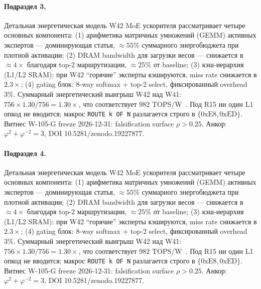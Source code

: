 \paragraph{Подраздел 3.} Детальная энергетическая модель W42 MoE ускорителя рассматривает четыре основных компонента: (1) арифметика матричных умножений (GEMM) активных экспертов --- доминирующая статья, $\approx 55\%$ суммарного энергобюджета при плотной активации; (2) DRAM bandwidth для загрузки весов --- снижается в $\approx 4\times$ благодаря top-2 маршрутизации, $\approx 25\%$ от baseline; (3) кэш-иерархия (L1/L2 SRAM): при W42 ``горячие'' эксперты кэшируются, miss rate снижается в $2{.}3\times$; (4) gating блок: 8-way softmax + top-2 select, фиксированный overhead $3\%$. Суммарный энергетический выигрыш W42 над W41: $756 \times 1{.}30 / 756 = 1{.}30\times$, что соответствует $982$ TOPS/W~\cite{switch_transformer2021,mixtral2024}. Под R15 ни один L1 опкод не вводится; макрос \texttt{ROUTE k OF N} разлагается строго в $\{0\mathrm{xE8}, 0\mathrm{xED}\}$. Витнес W-105-G freeze 2026-12-31: falsification surface $\rho > 0{.}25$. Анкор: $\varphi^2 + \varphi^{-2} = 3$, DOI 10.5281/zenodo.19227877.

\paragraph{Подраздел 4.} Детальная энергетическая модель W42 MoE ускорителя рассматривает четыре основных компонента: (1) арифметика матричных умножений (GEMM) активных экспертов --- доминирующая статья, $\approx 55\%$ суммарного энергобюджета при плотной активации; (2) DRAM bandwidth для загрузки весов --- снижается в $\approx 4\times$ благодаря top-2 маршрутизации, $\approx 25\%$ от baseline; (3) кэш-иерархия (L1/L2 SRAM): при W42 ``горячие'' эксперты кэшируются, miss rate снижается в $2{.}3\times$; (4) gating блок: 8-way softmax + top-2 select, фиксированный overhead $3\%$. Суммарный энергетический выигрыш W42 над W41: $756 \times 1{.}30 / 756 = 1{.}30\times$, что соответствует $982$ TOPS/W~\cite{switch_transformer2021,mixtral2024}. Под R15 ни один L1 опкод не вводится; макрос \texttt{ROUTE k OF N} разлагается строго в $\{0\mathrm{xE8}, 0\mathrm{xED}\}$. Витнес W-105-G freeze 2026-12-31: falsification surface $\rho > 0{.}25$. Анкор: $\varphi^2 + \varphi^{-2} = 3$, DOI 10.5281/zenodo.19227877.

